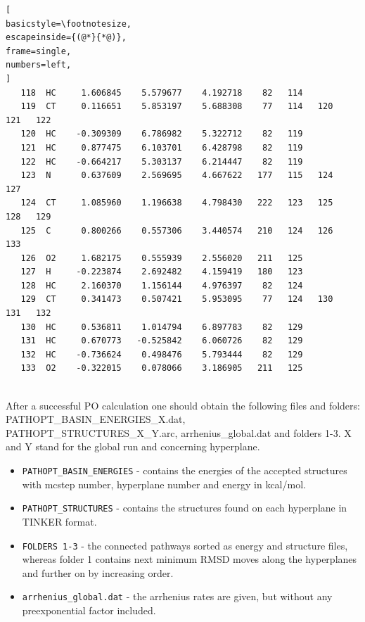 \documentclass[a4paper,11pt]{scrartcl}
\begin{document}
\begin{lstlisting}[
basicstyle=\footnotesize,
escapeinside={(@*}{*@)},
frame=single,
numbers=left,
]
   118  HC     1.606845    5.579677    4.192718    82   114
   119  CT     0.116651    5.853197    5.688308    77   114   120   121   122
   120  HC    -0.309309    6.786982    5.322712    82   119
   121  HC     0.877475    6.103701    6.428798    82   119
   122  HC    -0.664217    5.303137    6.214447    82   119
   123  N      0.637609    2.569695    4.667622   177   115   124   127
   124  CT     1.085960    1.196638    4.798430   222   123   125   128   129
   125  C      0.800266    0.557306    3.440574   210   124   126   133
   126  O2     1.682175    0.555939    2.556020   211   125
   127  H     -0.223874    2.692482    4.159419   180   123
   128  HC     2.160370    1.156144    4.976397    82   124
   129  CT     0.341473    0.507421    5.953095    77   124   130   131   132
   130  HC     0.536811    1.014794    6.897783    82   129
   131  HC     0.670773   -0.525842    6.060726    82   129
   132  HC    -0.736624    0.498476    5.793444    82   129
   133  O2    -0.322015    0.078066    3.186905   211   125


\end{lstlisting} 

After a successful PO calculation one should obtain the following files and folders: PATHOPT\_BASIN\_ENERGIES\_X.dat, PATHOPT\_STRUCTURES\_X\_Y.arc, arrhenius\_global.dat and folders 1-3. X and Y stand for the global run and concerning hyperplane.\newline

\begin{itemize}

\item \texttt{PATHOPT\_BASIN\_ENERGIES} - contains the energies of the accepted structures with mcstep number, hyperplane number and energy in kcal/mol.

\item \texttt{PATHOPT\_STRUCTURES} - contains the structures found on each hyperplane in TINKER format.

\item \texttt{FOLDERS 1-3} - the connected pathways sorted as energy and structure files, whereas folder 1 contains next minimum RMSD moves along the hyperplanes and further on by increasing order.


\item \texttt{arrhenius\_global.dat} - the arrhenius rates are given, but without any preexponential factor included.

\end{itemize}
\end{document}
